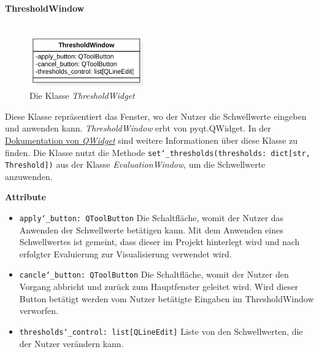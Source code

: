 \documentclass{article}
\begin{document}
\newpage
\textbf{\large{ThresholdWindow}}\\\\
\begin{figure}[H]%
    \centering
    \includegraphics[width=5cm]{entwurf/Entwurf_dokument/img/klassenView/ThresholdWindow.png}
    \caption{Die Klasse \textit{ThresholdWidget}}
\end{figure}
Diese Klasse repräsentiert das Fenster, wo der Nutzer die Schwellwerte eingeben und anwenden kann. \textit{ThresholdWindow} erbt von pyqt.QWidget. In der \href{https://doc.qt.io/qt-6/qwidget.html}{Dokumentation von \textit{QWidget}} sind weitere Informationen über diese Klasse zu finden. Die Klasse nutzt die Methode \texttt{set\char`_thresholds(thresholds: dict[str, Threshold])} aus der Klasse \textit{EvaluationWindow}, um die Schwellwerte anzuwenden.
\newline \newline

\textbf{{Attribute}}
\begin{itemize}
\item \texttt{apply\char`_button: QToolButton} \newline Die Schaltfläche, womit der Nutzer das Anwenden der Schwellwerte betätigen kann. Mit dem Anwenden eines Schwellwertes ist gemeint, dass dieser im Projekt hinterlegt wird und nach erfolgter Evaluierung zur Visualisierung verwendet wird.

\item \texttt{cancle\char`_button: QToolButton} \newline Die Schaltfläche, womit der Nutzer den Vorgang abbricht und zurück zum Hauptfenster geleitet wird. Wird dieser Button betätigt werden vom Nutzer betätigte Eingaben im ThresholdWindow verworfen.

\item \texttt{thresholds\char`_control: list[QLineEdit]} \newline Liste von den Schwellwerten, die der Nutzer verändern kann.
\end{itemize}
\end{document}
